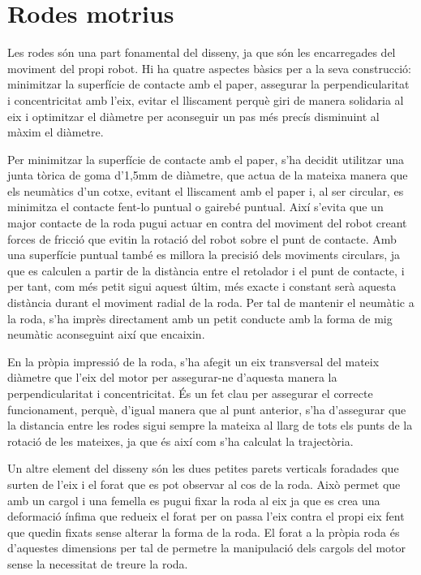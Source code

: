 \section{Rodes motrius}

Les rodes són una part fonamental del disseny, ja que són les encarregades del moviment del propi robot. Hi ha quatre aspectes bàsics per a la seva construcció: minimitzar la superfície de contacte amb el paper, assegurar la perpendicularitat i concentricitat amb l’eix, evitar el lliscament perquè giri de manera solidaria al eix i optimitzar el diàmetre per aconseguir un pas més precís disminuint al màxim el diàmetre. 

Per minimitzar la superfície de contacte amb el paper, s’ha decidit utilitzar una junta tòrica de goma d’1,5mm de diàmetre, que actua de la mateixa manera que els neumàtics d’un cotxe, evitant el lliscament amb el paper i, al ser circular, es minimitza el contacte fent-lo puntual o gairebé puntual. Així s’evita que un major contacte de la roda pugui actuar en contra del moviment del robot creant forces de fricció que evitin la rotació del robot sobre el punt de contacte. Amb una superfície puntual també es millora la precisió dels moviments circulars, ja que es calculen a partir de la distància entre el retolador i el punt de contacte, i per tant, com més petit sigui aquest últim, més exacte i constant serà aquesta distància durant el moviment radial de la roda. Per tal de mantenir el neumàtic a la roda, s’ha imprès directament amb un petit conducte amb la forma de mig neumàtic aconseguint així que encaixin. 

En la pròpia impressió de la roda, s’ha afegit un eix transversal del mateix diàmetre que l’eix del motor per assegurar-ne d’aquesta manera la perpendicularitat i concentricitat. És un fet clau per assegurar el correcte funcionament, perquè, d’igual manera que al punt anterior, s’ha d’assegurar que la distancia entre les rodes sigui sempre la mateixa al llarg de tots els punts de la rotació de les mateixes, ja que és així com s’ha calculat la trajectòria. 

Un altre element del disseny són les dues petites parets verticals foradades que surten de l’eix i el forat que es pot observar al cos de la roda. Això permet que amb un cargol i una femella es pugui fixar la roda al eix ja que es crea una deformació ínfima que redueix el forat per on passa l’eix contra el propi eix fent que quedin fixats sense alterar la forma de la roda. El forat a la pròpia roda és d’aquestes dimensions per tal de permetre la manipulació dels cargols del motor sense la necessitat de treure la roda. 

